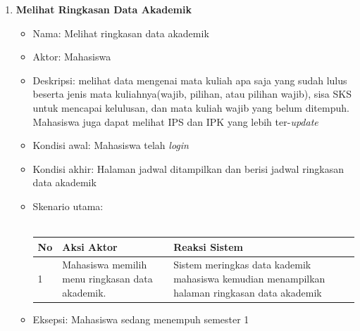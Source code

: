 \begin{enumerate}
	\item \textbf{Melihat Ringkasan Data Akademik}
		\begin{itemize}
			\item Nama: Melihat ringkasan data akademik
			\item Aktor: Mahasiswa
			\item Deskripsi: melihat data mengenai mata kuliah apa saja yang sudah lulus beserta jenis mata kuliahnya(wajib, pilihan, atau pilihan wajib), sisa SKS untuk mencapai kelulusan, dan mata kuliah wajib yang belum ditempuh. Mahasiswa juga dapat melihat IPS dan IPK yang lebih ter-\textit{update}
			\item Kondisi awal: Mahasiswa telah \textit{login}
			\item Kondisi akhir: Halaman jadwal ditampilkan dan berisi jadwal ringkasan data akademik
			\item Skenario utama: \\ \\
			\begin{tabular}{|p{0.5cm} |p{6cm}| p{6cm}|}
						\hline
							No 	& Aksi Aktor & Reaksi Sistem \\ \hline
							1 	& Mahasiswa memilih menu ringkasan data akademik. 	&	Sistem meringkas data kademik mahasiswa kemudian menampilkan halaman ringkasan data akademik \\ \hline 
						\end{tabular} 
			\item Eksepsi: Mahasiswa sedang menempuh semester 1
		\end{itemize}
\end{enumerate}

